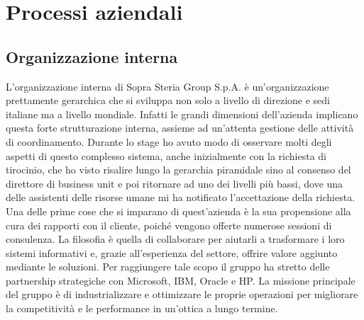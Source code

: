 \section{Processi aziendali}

	\subsection{Organizzazione interna}
	
	L'organizzazione interna di Sopra Steria Group S.p.A. è un'organizzazione prettamente gerarchica	 che si sviluppa non solo a livello di direzione e sedi italiane ma a livello mondiale. Infatti le grandi dimensioni dell'azienda implicano questa forte strutturazione interna, assieme ad un'attenta gestione delle attività di coordinamento. Durante lo stage ho avuto modo di osservare molti degli aspetti di questo complesso sistema, anche inizialmente con la richiesta di tirocinio, che ho visto risalire lungo la gerarchia piramidale sino al consenso del direttore di business unit e poi ritornare ad uno dei livelli più bassi, dove una delle assistenti delle risorse umane mi ha notificato l'accettazione della richiesta.\\
	
	Una delle prime cose che si imparano di quest'azienda è la sua propensione alla cura dei rapporti con il cliente, poiché vengono offerte numerose sessioni	di consulenza. La filosofia è quella di collaborare per aiutarli a trasformare i loro sistemi informativi e, grazie all'esperienza del settore, offrire valore aggiunto mediante le soluzioni. Per raggiungere tale scopo il gruppo ha stretto delle partnership strategiche con Microsoft, IBM, Oracle e HP. La missione principale del gruppo è di industrializzare e ottimizzare le proprie operazioni per migliorare la competitività e le performance in un'ottica a lungo termine.\\
	
